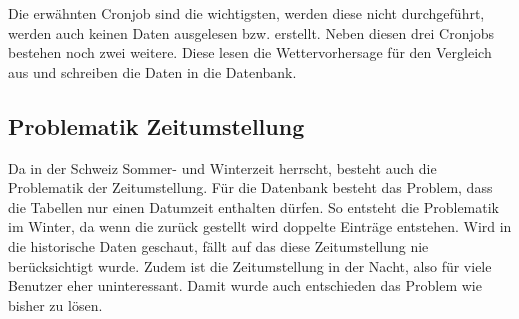 Die erwähnten Cronjob sind die wichtigsten, werden diese nicht durchgeführt, werden auch keinen Daten ausgelesen bzw. erstellt. Neben diesen drei Cronjobs bestehen noch zwei weitere. Diese lesen die Wettervorhersage für den Vergleich aus und schreiben die Daten in die Datenbank.

\subsection{Problematik Zeitumstellung}
Da in der Schweiz Sommer- und Winterzeit herrscht, besteht auch die Problematik der Zeitumstellung. Für die Datenbank besteht das Problem, dass die Tabellen nur einen Datumzeit enthalten dürfen. So entsteht die Problematik im Winter, da wenn die zurück gestellt wird doppelte Einträge entstehen. Wird in die historische Daten geschaut, fällt auf das diese Zeitumstellung nie berücksichtigt wurde. Zudem ist die Zeitumstellung in der Nacht, also für viele Benutzer eher uninteressant. Damit wurde auch entschieden das Problem wie bisher zu lösen.


\newline
